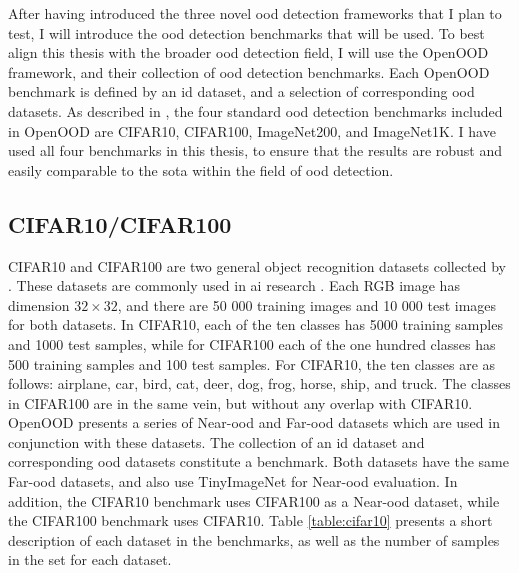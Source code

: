 \documentclass[UKenglish]{uiomasterthesis} %
\theoremstyle{definition}
\begin{document}
After having introduced the three novel \ac{ood} detection frameworks that I plan to test, I will introduce the \ac{ood} detection benchmarks that will be used. To best align this thesis with the broader \ac{ood} detection field, I will use the OpenOOD framework, and their collection of \ac{ood} detection benchmarks. Each OpenOOD benchmark is defined by an \ac{id} dataset, and a selection of corresponding \ac{ood} datasets. As described in \cite{openood15}, the four standard \ac{ood} detection benchmarks included in OpenOOD are CIFAR10, CIFAR100, ImageNet200, and ImageNet1K. I have used all four benchmarks in this thesis, to ensure that the results are robust and easily comparable to the \ac{sota} within the field of \ac{ood} detection.

\subsection{CIFAR10/CIFAR100}

CIFAR10 and CIFAR100 are two general object recognition datasets collected by \cite{cifar}. These datasets are commonly used in \ac{ai} research \cite{pouyanfar2018survey}. Each RGB image has dimension $32 \times 32$, and there are 50 000 training images and 10 000 test images for both datasets. In CIFAR10, each of the ten classes has 5000 training samples and 1000 test samples, while for CIFAR100 each of the one hundred classes has 500 training samples and 100 test samples. For CIFAR10, the ten classes are as follows: airplane, car, bird, cat, deer, dog, frog, horse, ship, and truck. The classes in CIFAR100 are in the same vein, but without any overlap with CIFAR10. OpenOOD presents a series of Near-\ac{ood} and Far-\ac{ood} datasets which are used in conjunction with these datasets. The collection of an \ac{id} dataset and corresponding \ac{ood} datasets constitute a benchmark. Both datasets have the same Far-\ac{ood} datasets, and also use TinyImageNet for Near-\ac{ood} evaluation. In addition, the CIFAR10 benchmark uses CIFAR100 as a Near-\ac{ood} dataset, while the CIFAR100 benchmark uses CIFAR10. Table \ref{table:cifar10} presents a short description of each dataset in the benchmarks, as well as the number of samples in the set for each dataset.
\end{document}
